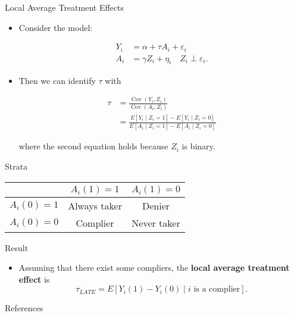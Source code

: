 \documentclass[handout]{beamer} %
\DeclareMathOperator*{\Cov}{Cov}
\begin{document}
\begin{frame}{Local Average Treatment Effects}

  \begin{itemize}
    \item Consider the model:

    \begin{align*}
      Y_i &= \alpha + \tau A_i + \varepsilon_i \\
      A_i &= \gamma Z_i + \eta_i \quad Z_i \perp \varepsilon_i.
    \end{align*}

    \item Then we can identify $\tau$ with

      \begin{align*}
        \tau &= \frac{\Cov(Y_i, Z_i)}{\Cov(A_i, Z_i)} \\
        &= \frac{E[Y_i \mid Z_i = 1] - E[Y_i \mid Z_i = 0]}{
          E[A_i \mid Z_i = 1] - E[A_i \mid Z_i = 0]}
      \end{align*}

      where the second equation holds because $Z_i$ is binary.
  \end{itemize}
  
\end{frame}

\begin{frame}{Strata}

  \begin{center}
    \begin{tabular}{rcc}
      \toprule
        & $A_i(1) = 1$ & $A_i(1) = 0$ \\
      \midrule
      $A_i(0) = 1$ & Always taker & Denier \\
      $A_i(0) = 0$ & Complier     & Never taker\\
      \bottomrule
    \end{tabular}
  \end{center}
  
\end{frame}

\begin{frame}{Result}

  \begin{itemize}
    \item Assuming that there exist some compliers, the \textbf{local average
      treatment effect} is
      \[\tau_{LATE} = E[Y_i(1) - Y_i(0) \mid i \text{ is a complier}].\]
  \end{itemize}
  
\end{frame}

\begin{frame}[allowframebreaks]{References}

  \printbibliography
  
\end{frame}
\end{document}
